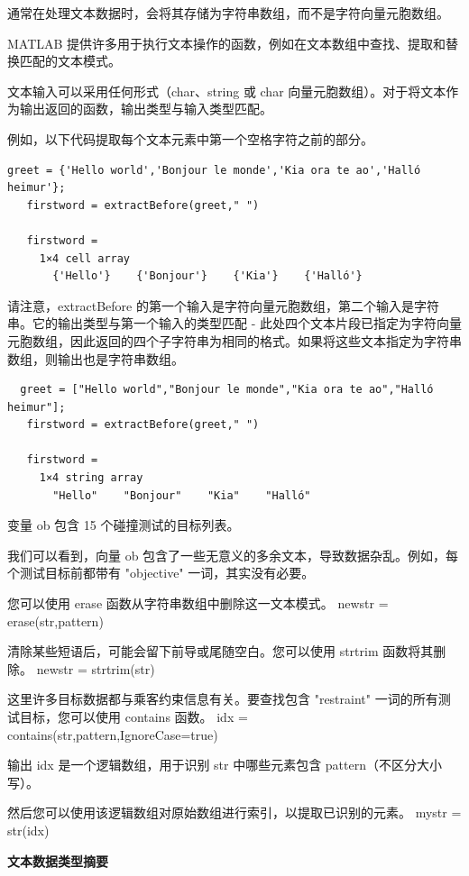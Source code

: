 \documentclass[12pt,a4paper]{article}
\begin{document}
通常在处理文本数据时，会将其存储为字符串数组，而不是字符向量元胞数组。


MATLAB 提供许多用于执行文本操作的函数，例如在文本数组中查找、提取和替换匹配的文本模式。

文本输入可以采用任何形式（char、string 或 char 向量元胞数组）。对于将文本作为输出返回的函数，输出类型与输入类型匹配。

例如，以下代码提取每个文本元素中第一个空格字符之前的部分。

\begin{lstlisting}
greet = {'Hello world','Bonjour le monde','Kia ora te ao','Halló heimur'};
   firstword = extractBefore(greet," ")

   firstword =
     1×4 cell array
       {'Hello'}    {'Bonjour'}    {'Kia'}    {'Halló'}
\end{lstlisting}
   

请注意，extractBefore 的第一个输入是字符向量元胞数组，第二个输入是字符串。它的输出类型与第一个输入的类型匹配 - 此处四个文本片段已指定为字符向量元胞数组，因此返回的四个子字符串为相同的格式。如果将这些文本指定为字符串数组，则输出也是字符串数组。


\begin{lstlisting}
  greet = ["Hello world","Bonjour le monde","Kia ora te ao","Halló heimur"];
   firstword = extractBefore(greet," ")

   firstword = 
     1×4 string array
       "Hello"    "Bonjour"    "Kia"    "Halló"
\end{lstlisting}
 
变量 ob 包含 15 个碰撞测试的目标列表。

我们可以看到，向量 ob 包含了一些无意义的多余文本，导致数据杂乱。例如，每个测试目标前都带有 "objective" 一词，其实没有必要。

您可以使用 erase 函数从字符串数组中删除这一文本模式。
newstr = erase(str,pattern)

清除某些短语后，可能会留下前导或尾随空白。您可以使用 strtrim 函数将其删除。
newstr = strtrim(str)

这里许多目标数据都与乘客约束信息有关。要查找包含 "restraint" 一词的所有测试目标，您可以使用 contains 函数。
idx = contains(str,pattern,IgnoreCase=true)

输出 idx 是一个逻辑数组，用于识别 str 中哪些元素包含 pattern（不区分大小写）。

然后您可以使用该逻辑数组对原始数组进行索引，以提取已识别的元素。
mystr = str(idx)

\textbf{文本数据类型摘要}
\end{document}
